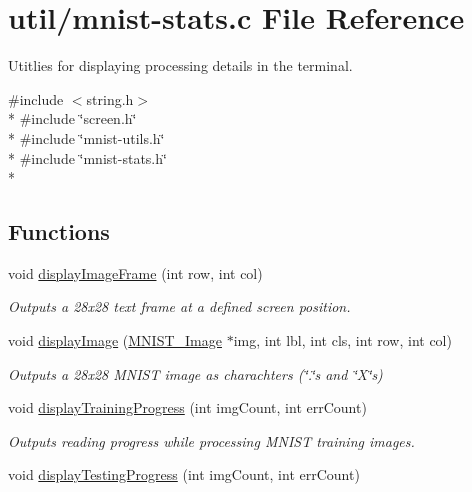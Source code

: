 \hypertarget{mnist-stats_8c}{}\section{util/mnist-\/stats.c File Reference}
\label{mnist-stats_8c}


Utitlies for displaying processing details in the terminal.  


{\ttfamily \#include $<$string.\+h$>$}\\*
{\ttfamily \#include \char`\"{}screen.\+h\char`\"{}}\\*
{\ttfamily \#include \char`\"{}mnist-\/utils.\+h\char`\"{}}\\*
{\ttfamily \#include \char`\"{}mnist-\/stats.\+h\char`\"{}}\\*
\subsection*{Functions}
\begin{DoxyCompactItemize}
\item 
void \hyperlink{mnist-stats_8c_a5ae5017857d59a0bb360be1cbebd4999}{display\+Image\+Frame} (int row, int col)
\begin{DoxyCompactList}\small\item\em Outputs a 28x28 text frame at a defined screen position. \end{DoxyCompactList}\item 
void \hyperlink{mnist-stats_8c_a53dfbeeccdcba8c3c5e707487f7d422e}{display\+Image} (\hyperlink{struct_m_n_i_s_t___image}{M\+N\+I\+S\+T\+\_\+\+Image} $\ast$img, int lbl, int cls, int row, int col)
\begin{DoxyCompactList}\small\item\em Outputs a 28x28 M\+N\+I\+S\+T image as charachters (\char`\"{}.\char`\"{}s and \char`\"{}\+X\char`\"{}s) \end{DoxyCompactList}\item 
void \hyperlink{mnist-stats_8c_ae72b998f2876df0e8b7cfa9501531e6e}{display\+Training\+Progress} (int img\+Count, int err\+Count)
\begin{DoxyCompactList}\small\item\em Outputs reading progress while processing M\+N\+I\+S\+T training images. \end{DoxyCompactList}\item 
void \hyperlink{mnist-stats_8c_a9331d15ac78b41bbed855cb8221168fb}{display\+Testing\+Progress} (int img\+Count, int err\+Count)
\end{DoxyCompactItemize}


